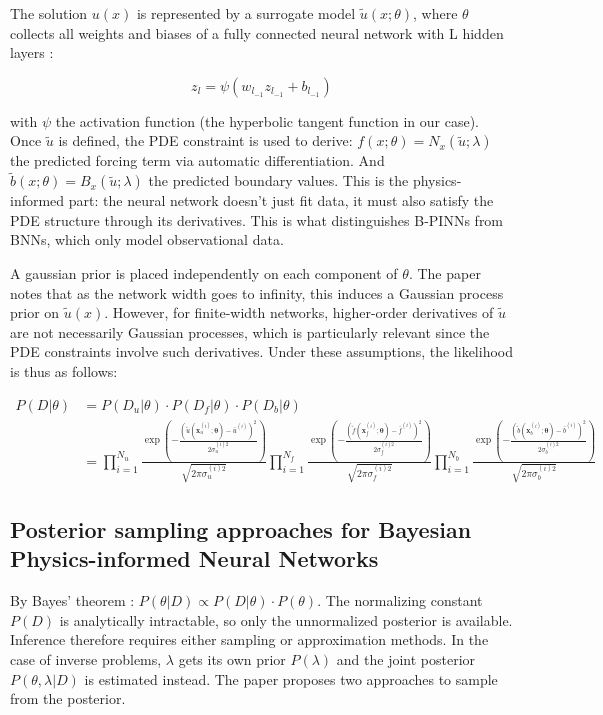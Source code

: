 \documentclass{article}
\begin{document}
The solution $u(x)$ is represented by a surrogate model $\tilde{u}(x; \theta)$, where $\theta$ collects all weights and biases of a fully connected neural network with L hidden layers : 

$$z_l = \psi(w_{l_{-1}} z_{l_{-1}} + b_{l_{-1}})$$

with $\psi$ the activation function (the hyperbolic tangent function in our case). Once $\tilde{u}$ is defined, the PDE constraint is used to derive: $f(x; \theta) = N_x(\tilde{u}; \lambda)$ the predicted forcing term via automatic differentiation. And $\tilde{b}(x; \theta) = B_x(\tilde{u}; \lambda)$ the predicted boundary values. This is the physics-informed part: the neural network doesn't just fit data, it must also satisfy the PDE structure through its derivatives. This is what distinguishes B-PINNs from BNNs, which only model observational data. 


A gaussian prior is placed independently on each component of $\theta$. The paper notes that as the network width goes to infinity, this induces a Gaussian process prior on $\tilde{u}(x)$. However, for finite-width networks, higher-order derivatives of $\tilde{u}$ are not necessarily Gaussian processes, which is particularly relevant since the PDE constraints involve such derivatives. Under these assumptions, the likelihood is thus as follows:

\begin{align*}
    P(D|\theta) &= P(D_u|\theta) · P(D_f|\theta) · P(D_b|\theta) \\
    &=  \prod_{i=1}^{N_u} \frac{\exp \left( -\frac{(\tilde{u}(\boldsymbol{x}_u^{(i)}; \boldsymbol{\theta}) - \bar{u}^{(i)})^2}{2\sigma_u^{(i)2}} \right)}{\sqrt{2\pi\sigma_u^{(i)2}}}  \prod_{i=1}^{N_f} \frac{ \exp \left( -\frac{(\tilde{f}(\boldsymbol{x}_f^{(i)}; \boldsymbol{\theta}) - \bar{f}^{(i)})^2}{2\sigma_f^{(i)2}} \right)}{\sqrt{2\pi\sigma_f^{(i)2}}} \prod_{i=1}^{N_b} \frac{\exp \left( -\frac{(\tilde{b}(\boldsymbol{x}_b^{(i)}; \boldsymbol{\theta}) - \bar{b}^{(i)})^2}{2\sigma_b^{(i)2}} \right)}{\sqrt{2\pi\sigma_b^{(i)2}}} 
\end{align*}


\subsection{Posterior sampling approaches for Bayesian Physics-informed Neural Networks}
 
By Bayes' theorem : $P(\theta|D) \propto P(D|\theta) · P(\theta)$. The normalizing constant $P(D)$ is analytically intractable, so only the unnormalized posterior is available. Inference therefore requires either sampling or approximation methods. In the case of inverse problems, $\lambda$ gets its own prior $P(\lambda)$ and the joint posterior $P(\theta, \lambda|D)$ is estimated instead. The paper proposes two approaches to sample from the posterior.
\end{document}
